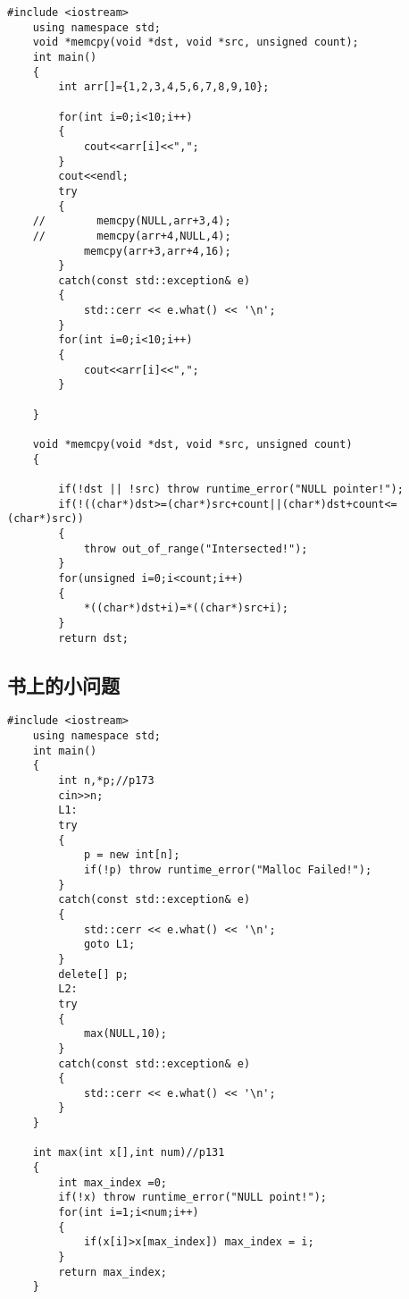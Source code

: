 \documentclass[UTF8]{ctexart}
\begin{document}
\begin{lstlisting}[language={[ANSI]C++}]
    #include <iostream>
    using namespace std;
    void *memcpy(void *dst, void *src, unsigned count);
    int main()
    {
        int arr[]={1,2,3,4,5,6,7,8,9,10};
        
        for(int i=0;i<10;i++)
        {
            cout<<arr[i]<<",";
        }
        cout<<endl;
        try
        {
    //        memcpy(NULL,arr+3,4);
    //        memcpy(arr+4,NULL,4);
            memcpy(arr+3,arr+4,16);
        }
        catch(const std::exception& e)
        {
            std::cerr << e.what() << '\n';
        }
        for(int i=0;i<10;i++)
        {
            cout<<arr[i]<<",";
        }
    
    }
    
    void *memcpy(void *dst, void *src, unsigned count)
    {
    
        if(!dst || !src) throw runtime_error("NULL pointer!");
        if(!((char*)dst>=(char*)src+count||(char*)dst+count<=(char*)src))
        {
            throw out_of_range("Intersected!");
        }
        for(unsigned i=0;i<count;i++)
        {
            *((char*)dst+i)=*((char*)src+i);
        }
        return dst;
\end{lstlisting}


\subsection{书上的小问题}

\begin{lstlisting}[language={[ANSI]C++}]
    #include <iostream>
    using namespace std;
    int main()
    {
        int n,*p;//p173
        cin>>n;
        L1:
        try
        {
            p = new int[n];
            if(!p) throw runtime_error("Malloc Failed!");
        }
        catch(const std::exception& e)
        {
            std::cerr << e.what() << '\n';
            goto L1;
        }
        delete[] p;
        L2:
        try
        {
            max(NULL,10);
        }
        catch(const std::exception& e)
        {
            std::cerr << e.what() << '\n';
        }
    }
    
    int max(int x[],int num)//p131
    {
        int max_index =0;
        if(!x) throw runtime_error("NULL point!");
        for(int i=1;i<num;i++)
        {
            if(x[i]>x[max_index]) max_index = i;
        }
        return max_index;
    }
    
\end{lstlisting}
\end{document}

